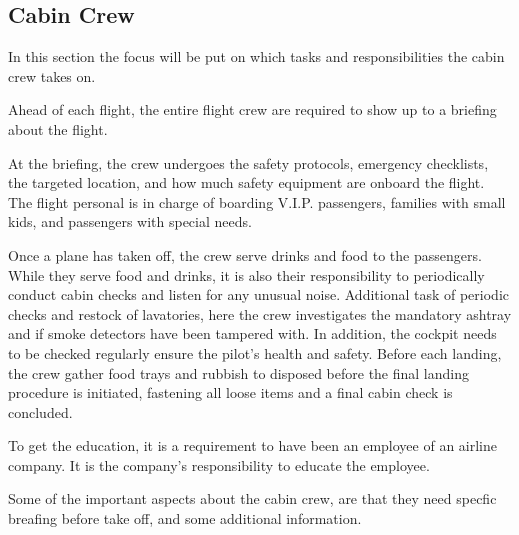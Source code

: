 \subsection{Cabin Crew}
In this section the focus will be put on which tasks and responsibilities the cabin crew takes on. 

Ahead of each flight, the entire flight crew are required to show up to a briefing about the flight.

At the briefing, the crew undergoes the safety protocols, emergency checklists, the targeted location, and how much safety equipment are onboard the flight. The flight personal is in charge of boarding V.I.P. passengers, families with small kids, and passengers with special needs.

Once a plane has taken off, the crew serve drinks and food to the passengers. While they serve food and drinks, it is also their responsibility to periodically conduct cabin checks and listen for any unusual noise. Additional task of periodic checks and restock of lavatories, here the crew investigates the mandatory ashtray and if smoke detectors have been tampered with. In addition, the cockpit needs to be checked regularly ensure the pilot's health and safety. Before each landing, the crew gather food trays and rubbish to disposed before the final landing procedure is initiated, fastening all loose items and a final cabin check is concluded.

To get the education, it is a requirement to have been an employee of an airline company. It is the company’s responsibility to educate the employee. 

Some of the important aspects about the cabin crew, are that they need specfic breafing before take off, and some additional information.
